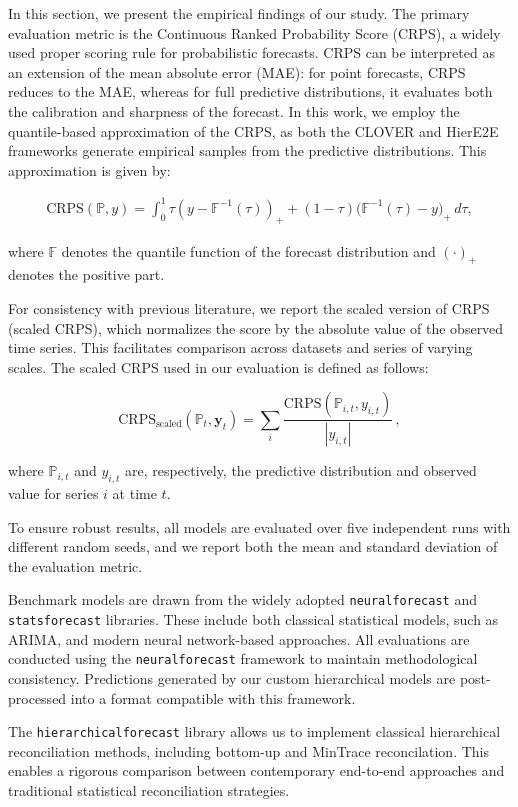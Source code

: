\documentclass[letterpaper]{article}
\begin{document}
In this section, we present the empirical findings of our study. 
The primary evaluation metric is the Continuous Ranked Probability Score (CRPS), a widely used proper scoring rule for probabilistic forecasts. 
CRPS can be interpreted as an extension of the mean absolute error (MAE): for point forecasts, CRPS reduces to the MAE, whereas for full predictive distributions, it evaluates both the calibration and sharpness of the forecast. 
In this work, we employ the quantile-based approximation of the CRPS, as both the CLOVER and HierE2E frameworks generate empirical samples from the predictive distributions. 
This approximation is given by:

\begin{align*}
    \text{CRPS}(\mathbb{P}, y) = \int_0^1 \tau(y - \mathbb{F}^{-1}(\tau))_+ + (1-\tau)\big(\mathbb{F}^{-1}(\tau) - y\big)_+\, d\tau,
\end{align*}

where $\mathbb{F}$ denotes the quantile function of the forecast distribution and $(\cdot)_+$ denotes the positive part.

For consistency with previous literature, we report the scaled version of CRPS (scaled CRPS), which normalizes the score by the absolute value of the observed time series. 
This facilitates comparison across datasets and series of varying scales. The scaled CRPS used in our evaluation is defined as follows:

\[
\text{CRPS}_{\text{scaled}}(\mathbf{\mathbb{P}}_t, \mathbf{y}_t) = \sum_i \frac{\text{CRPS}(\mathbb{P}_{i,t}, y_{i,t})}{|y_{i,t}|} \,,
\]

where $\mathbb{P}_{i,t}$ and $y_{i,t}$ are, respectively, the predictive distribution and observed value for series $i$ at time $t$.

To ensure robust results, all models are evaluated over five independent runs with different random seeds, and we report both the mean and standard deviation of the evaluation metric.

Benchmark models are drawn from the widely adopted \texttt{neuralforecast} and \texttt{statsforecast} libraries. 
These include both classical statistical models, such as ARIMA, and modern neural network-based approaches. 
All evaluations are conducted using the \texttt{neuralforecast} framework to maintain methodological consistency. 
Predictions generated by our custom hierarchical models are post-processed into a format compatible with this framework.

The \texttt{hierarchicalforecast} library allows us to implement classical hierarchical reconciliation methods, including bottom-up and MinTrace reconcilation. 
This enables a rigorous comparison between contemporary end-to-end approaches and traditional statistical reconciliation strategies.
\end{document}
